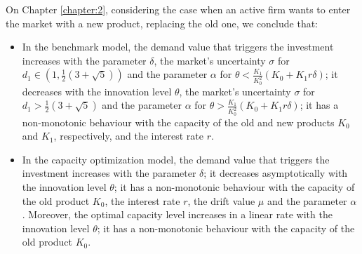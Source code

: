 On Chapter \ref{chapter:2}, considering the case when an active firm wants to enter the market with a new product, replacing the old one, we conclude that:
\begin{itemize}
	\item In the benchmark model, the demand value that triggers the investment increases with the parameter $\delta$, the market's uncertainty $\sigma$ for $d_1 \in \left(1, \frac{1}{2} (3+\sqrt{5}) \right)$ and the parameter $\alpha$ for $\theta < \frac{K_1}{K_0^2}(K_0+K_1 r \delta)$; it decreases with the innovation level $\theta$, the market's uncertainty $\sigma$ for $d_1 >  \frac{1}{2} (3+\sqrt{5}) $ and the parameter $\alpha$ for $\theta > \frac{K_1}{K_0^2}(K_0+K_1 r \delta)$; it has a non-monotonic behaviour with the capacity of the old and new products $K_0$ and $K_1$, respectively, and the interest rate $r$.
	
	\item In the capacity optimization model, the demand value that triggers the investment increases with the parameter $\delta$; it decreases asymptotically with the innovation level $\theta$; it has a non-monotonic behaviour with the capacity of the old product $K_0$, the interest rate $r$, the drift value $\mu$ and the parameter $\alpha$.
	Moreover, the optimal capacity level increases in a linear rate with the innovation level $\theta$; it has a non-monotonic behaviour with the capacity of the old product $K_0$.
\end{itemize}






